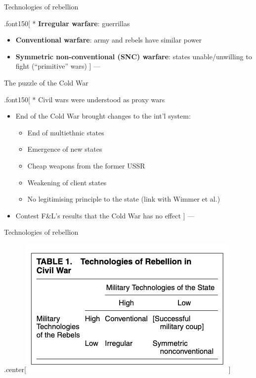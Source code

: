 \documentclass[ignorenonframetext,]{beamer}
\providecommand{\tightlist}{%
  \setlength{\itemsep}{0pt}\setlength{\parskip}{0pt}}
\begin{document}
\begin{frame}{Technologies of rebellion}

.font150{[} * \textbf{Irregular warfare}: guerrillas

\begin{itemize}
\item
  \textbf{Conventional warfare}: army and rebels have similar power
\item
  \textbf{Symmetric non-conventional (SNC) warfare}: states
  unable/unwilling to fight (``primitive'' wars) {]} ---
\end{itemize}

\end{frame}

\begin{frame}{The puzzle of the Cold War}

.font150{[} * Civil wars were understood as proxy wars

\begin{itemize}
\tightlist
\item
  End of the Cold War brought changes to the int'l system:

  \begin{itemize}
  \tightlist
  \item
    End of multiethnic states
  \item
    Emergence of new states
  \item
    Cheap weapons from the former USSR
  \item
    Weakening of client states
  \item
    No legitimising principle to the state (link with Wimmer et al.)
  \end{itemize}
\item
  Contest F\&L's results that the Cold War has no effect {]} ---
\end{itemize}

\end{frame}

\begin{frame}{Technologies of rebellion}

\begin{block}{.center{[}\includegraphics{kb01.png}{]}}

\end{block}

\end{frame}
\end{document}
